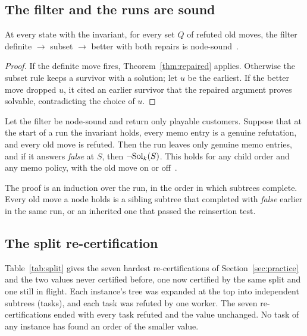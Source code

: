 \subsection{The filter and the runs are sound}
\label{app:machinery}

\begin{proposition}\label{prop:filter}
At every state with the invariant, for every set $Q$ of refuted old moves, the
filter definite $\to$ subset $\to$ better with both repairs is node-sound~.
\end{proposition}
\begin{proof}
If the definite move fires, Theorem~\ref{thm:repaired} applies. Otherwise the
subset rule keeps a survivor with a solution; let $u$ be the earliest. If the
better move dropped $u$, it cited an earlier survivor that the repaired
argument proves solvable, contradicting the choice of $u$.
\end{proof}

\begin{theorem}\label{thm:runs}
Let the filter be node-sound and return only playable customers. Suppose that
at the start of a run the invariant holds, every memo entry is a genuine
refutation, and every old move is refuted. Then the run leaves only genuine memo entries, and if
it answers \emph{false} at $S$, then $\neg\mathrm{Sol}_k(S)$. This holds for any child
order and any memo policy, with the old move on or off~.
\end{theorem}
The proof is an induction over the run, in the order in which subtrees complete.
Every old move a node holds is a sibling subtree that completed with \emph{false}
earlier in the same run, or an inherited one that passed the reinsertion test.

\subsection{The split re-certification}
\label{app:split}

Table~\ref{tab:split} gives the seven hardest re-certifications of
Section~\ref{sec:practice} and the two values never certified before, one now
certified by the same split and one still in flight. Each instance's tree was expanded at the top into
independent subtrees (tasks), and each task was refuted by one worker. The
seven re-certifications ended with every task refuted and the value unchanged.
No task of any instance has found an order of the smaller value.

\begin{table}[h]
\centering\small
\caption{All seven hardest values re-certify unchanged, at 18 to 369
core-hours each. Of the two values never certified before, 21 for
\texttt{Random-125-125-2-3\_0} is now certified, and 25 for
\texttt{Random-125-125-2-2\_0} is in flight with no task satisfiable so far
(read 9 October 2026). \emph{Value}: the stored optimum;
\emph{$k$}: the value minus one, which must be refuted. For an instance in
flight, the nodes and core-hours are those of the tasks finished so far.}
\label{tab:split}

\end{table}
